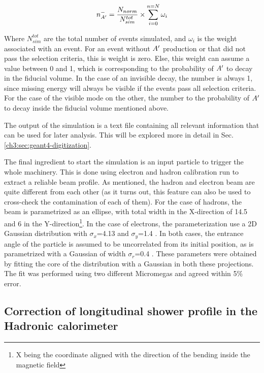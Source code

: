\begin{equation}
  \label{eq:1}
  n^-_{A'} = \frac{N_{norm}}{N^{tot}_{sim}} \times \sum^{n=N}_{i=0} \omega_i
\end{equation}

Where $N^{tot}_{sim}$ are the total number of events simulated, and $\omega_i$ is the weight associated with an event. For an event without $A'$ production or that did not pass the selection criteria, this is weight is zero. Else, this weight can assume a value between 0 and 1, which is corresponding to the probability of $A'$ to decay in the fiducial volume. In the case of an invisible decay, the number is always 1, since missing energy will always be visible if the events pass all selection criteria. For the case of the visible mode on the other, the number to the probability of $A'$ to decay inside the fiducial volume mentioned above.

The output of the simulation is a text file containing all relevant information that can be used for later analysis. This will be explored more in detail in Sec.\ref{ch3:sec:geant4-digitization}.

The final ingredient to start the simulation is an input particle to trigger the whole machinery. This is done using electron and hadron calibration run to extract a reliable beam profile. As mentioned, the hadron and electron beam are quite different from each other (as it turns out, this feature can also be used to cross-check the contamination of each of them). For the case of hadrons, the beam is parametrized as an ellipse, with total width in the X-direction of 14.5 \mmi and 6 \mmi in the Y-direction\footnote{X being the coordinate aligned with the direction of the bending inside the magnetic field}. In the case of electrons, the parameterization use a 2D Gaussian distribution with $\sigma_x$=4.13 \mmi and $\sigma_y$=1.4 \mmi. In both cases, the entrance angle of the particle is assumed to be uncorrelated from its initial position, as is parametrized with a Gaussian of width $\sigma_r$=0.4 \mrad. These parameters were obtained by fitting the core of the distribution with a Gaussian in both these projections. The fit was performed using two different Micromegas and agreed within 5\% error.

\subsection{Correction of longitudinal shower profile in the Hadronic calorimeter}
\label{ch3:sec:geant4-hcal-corr}

